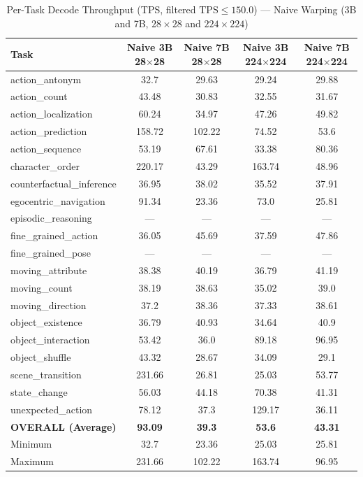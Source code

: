 \documentclass[conference]{IEEEtran}
\begin{document}
\begin{table}[!t]
  \centering
  \caption{Per-Task Decode Throughput (TPS, filtered $\text{TPS} \leq 150.0$)
           --- Naive Warping (3B and 7B, $28{\times}28$ and $224{\times}224$)}
  \label{tab:naive_tps}
  \begin{tabular}{lcccc}
    \toprule
    \textbf{Task}
      & \textbf{Naive 3B 28$\times$28}
      & \textbf{Naive 7B 28$\times$28}
      & \textbf{Naive 3B 224$\times$224}
      & \textbf{Naive 7B 224$\times$224} \\
    \midrule
    action\_antonym            & 32.7   & 29.63  & 29.24  & 29.88 \\
    action\_count              & 43.48  & 30.83  & 32.55  & 31.67 \\
    action\_localization       & 60.24  & 34.97  & 47.26  & 49.82 \\
    action\_prediction         & 158.72 & 102.22 & 74.52  & 53.6  \\
    action\_sequence           & 53.19  & 67.61  & 33.38  & 80.36 \\
    character\_order           & 220.17 & 43.29  & 163.74 & 48.96 \\
    counterfactual\_inference  & 36.95  & 38.02  & 35.52  & 37.91 \\
    egocentric\_navigation     & 91.34  & 23.36  & 73.0   & 25.81 \\
    episodic\_reasoning        & ---    & ---    & ---    & ---   \\
    fine\_grained\_action      & 36.05  & 45.69  & 37.59  & 47.86 \\
    fine\_grained\_pose        & ---    & ---    & ---    & ---   \\
    moving\_attribute          & 38.38  & 40.19  & 36.79  & 41.19 \\
    moving\_count              & 38.19  & 38.63  & 35.02  & 39.0  \\
    moving\_direction          & 37.2   & 38.36  & 37.33  & 38.61 \\
    object\_existence          & 36.79  & 40.93  & 34.64  & 40.9  \\
    object\_interaction        & 53.42  & 36.0   & 89.18  & 96.95 \\
    object\_shuffle            & 43.32  & 28.67  & 34.09  & 29.1  \\
    scene\_transition          & 231.66 & 26.81  & 25.03  & 53.77 \\
    state\_change              & 56.03  & 44.18  & 70.38  & 41.31 \\
    unexpected\_action         & 78.12  & 37.3   & 129.17 & 36.11 \\
    \midrule
    \textbf{OVERALL (Average)} & \textbf{93.09} & \textbf{39.3}
                               & \textbf{53.6}  & \textbf{43.31} \\
    Minimum                    & 32.7   & 23.36  & 25.03  & 25.81 \\
    Maximum                    & 231.66 & 102.22 & 163.74 & 96.95 \\
    \bottomrule
  \end{tabular}
\end{table}
\end{document}
